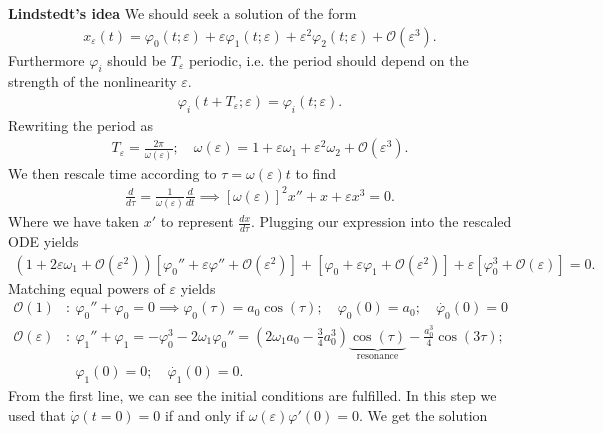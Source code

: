 \begin{ex}
\noindent
\textbf{Lindstedt's idea} We should seek a solution of the form
\begin{align}
	x_{\varepsilon}(t) = \varphi_0(t;\varepsilon) + \varepsilon \varphi_1 (t;\varepsilon) + \varepsilon^2 \varphi_2(t;\varepsilon) + \mathcal{O}(\varepsilon^3).
\end{align}
Furthermore $\varphi_i$ should be $T_\varepsilon$ periodic, i.e. the period should depend on the strength of the  nonlinearity $\varepsilon$.
\begin{align}
	\varphi_i(t+T_\varepsilon; \varepsilon) = \varphi_i(t;\varepsilon).
\end{align}
Rewriting the period as
\begin{align}
	T_\varepsilon = \frac{2 \pi }{\omega(\varepsilon)}; \quad \omega(\varepsilon) = 1 + \varepsilon \omega_1 + \varepsilon^2 \omega_2 + \mathcal{O}(\varepsilon^3).
\end{align}
We then rescale time according to $\tau = \omega(\varepsilon) t$ to find
\begin{align}
	\frac{d}{d\tau} = \frac{1}{\omega(\varepsilon)} \frac{d}{dt} \implies 
	\boxed{[\omega(\varepsilon)]^2 x'' + x + \varepsilon x^3 = 0.}
\end{align}
Where we have taken $x'$ to represent $\frac{dx}{d\tau}$. Plugging our expression into the rescaled ODE yields
\begin{align}
	\left( 1 + 2 \varepsilon \omega_1 + \mathcal{O}(\varepsilon^2) \right) \left[ \varphi_0'' + \varepsilon \varphi'' + \mathcal{O}(\varepsilon^2) \right] + \left[ \varphi_0 + \varepsilon \varphi_1 + \mathcal{O}(\varepsilon^2) \right] + \varepsilon \left[\varphi_0^{3} + \mathcal{O}(\varepsilon) \right] = 0.
\end{align}
Matching equal powers of $\varepsilon$ yields
\begin{subequations}\begin{align}
	\mathcal{O}(1)&:\ \varphi_0'' + \varphi_0 = 0 \implies \varphi_0(\tau) = a_0 \cos(\tau);\quad \varphi_0(0)=a_0;\quad \dot{\varphi_0}(0) = 0 \\
	\mathcal{O}(\varepsilon)&:\ \varphi_1'' + \varphi_1 = - \varphi^3_0 - 2\omega_1 \varphi_{0}'' = 
	\left(2 \omega_1 a_0 - \frac{3}{4}a_0^{3}\right) \underbrace{\cos (\tau)}_{ \textrm{resonance} } - \frac{a_0^{3}}{4} \cos(3 \tau); \\
			     &\phantom{:}\ \varphi_1(0)=0; \quad \dot{\varphi_1}(0) = 0. 
\end{align}\end{subequations}
From the first line, we can see the initial conditions are fulfilled. In this step we used that $\dot{\varphi}(t=0) = 0$ if and only if $\omega(\varepsilon)\varphi '(0) = 0$. We get the solution

\end{ex}
